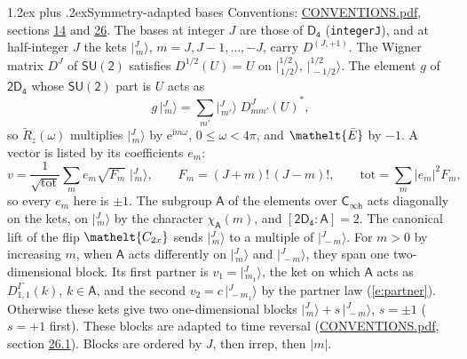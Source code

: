 \documentclass[10pt,a4paper]{article}
\makeatletter
\renewcommand\section{\@startsection{section}{1}{\z@}{-3ex plus -1ex minus -.2ex}%
  {1.2ex plus .2ex}{\normalfont\large\sffamily\bfseries\color{parttitle}}}
\numberwithin{equation}{section}
\newcommand{\eltfont}[1]{{\let\sigma\eltsigma\mathelt{#1}}}
\newcommand{\grp}[1]{\mathsf{#1}}
\newcommand{\elt}[1]{\eltfont{#1}}
\newcommand{\grpindex}[2]{[#1 : #2]}
\newcommand{\iunit}{\mathrm{i}}
\newcommand{\expe}{\mathrm{e}}
\newcommand{\irrJp}[2]{D^{(#1,#2)}}
\newcommand{\repD}[1]{D^{#1}}
\newcommand{\wignerD}[1]{D^{#1}}
\newcommand{\chiA}{\chi_{\grp{A}}}
\newcommand{\conj}[1]{{#1}^{*}}
\newcommand{\jm}[2]{\bigl\lvert{}^{#1}_{\,#2}\bigr\rangle}
\newcommand{\barred}[1]{\bar{#1}}
\newcommand{\lift}[1]{\tilde{#1}}
\makeatother
\begin{document}
\section{Symmetry-adapted bases}\label{s:bases}
Conventions: \href{../../CONVENTIONS.pdf}{CONVENTIONS.pdf}, sections \href{../../../rotation/CONVENTIONS.pdf\#conv.14}{14} and \href{../../CONVENTIONS.pdf\#conv.26}{26}.
\leavevmode\label{n:index.m}\label{n:vector.ket}The bases at integer $J$ are those of \href{../../../rotation/data/pdf/D4.pdf}{$\grp{D_{4}}$} (\texttt{integerJ}), and at half-integer $J$ the kets $\jm{J}{m}$, $m = J, J-1, \dots, -J$, carry $\irrJp{J}{+1}$. \label{n:matrix.wigner}The Wigner matrix $\wignerD{J}$ of $\grp{SU(2)}$ satisfies $\wignerD{1/2}(U) = U$ on $\jm{1/2}{1/2}$, $\jm{1/2}{-1/2}$. The element $g$ of $\grp{2D_{4}}$ whose $\grp{SU(2)}$ part is $U$ acts as
\begin{equation}\label{e:action}g\,\jm{J}{m} = \sum_{m'} \jm{J}{m'}\; \conj{\wignerD{J}_{m m'}(U)},\end{equation}
so $\lift{R}_{z}(\omega)$ multiplies $\jm{J}{m}$ by $\expe^{\iunit m\omega}$, $0 \le \omega < 4\pi$, and $\elt{\barred{E}}$ by $-1$. \label{n:index.ketcoefficient}\label{n:vector.basis.symmetry}\label{n:index.ketweight}\label{n:index.total}A vector is listed by its coefficients $e_m$:
\begin{equation}\label{e:ket}v = \frac{1}{\sqrt{\mathrm{tot}}}\sum_m e_m\sqrt{F_m}\;\jm{J}{m},\qquad F_m = (J+m)!\,(J-m)!,\qquad \mathrm{tot} = \sum_m |e_m|^2F_m,\end{equation}
so every $e_m$ here is $\pm 1$.
\leavevmode\label{n:group.A}\label{n:function.character.abelian}The subgroup $\grp{A}$ of the elements over $\grp{C_{\infty h}}$ acts diagonally on the kets, on $\jm{J}{m}$ by the character $\chiA(m)$, and $\grpindex{\grp{2D_{4}}}{\grp{A}} = 2$. The canonical lift of the flip $\elt{C_{2x}}$ sends $\jm{J}{m}$ to a multiple of $\jm{J}{-m}$. For $m > 0$ by increasing $m$, when $\grp{A}$ acts differently on $\jm{J}{m}$ and $\jm{J}{-m}$, they span one two-dimensional block. \label{n:index.partner.sign}Its first partner is $v_1 = \jm{J}{m_1}$, the ket on which $\grp{A}$ acts as $\repD{\Gamma}_{1,1}(k)$, $k \in \grp{A}$, and the second $v_2 = c\,\jm{J}{-m_1}$ by the partner law (\ref{e:partner}). \label{n:index.pair.sign}Otherwise these kets give two one-dimensional blocks $\jm{J}{m} + s\,\jm{J}{-m}$, $s = \pm 1$ ($s = +1$ first). These blocks are adapted to time reversal (\href{../../CONVENTIONS.pdf}{CONVENTIONS.pdf}, section \href{../../CONVENTIONS.pdf\#conv.26.1}{26.1}). Blocks are ordered by $J$, then irrep, then $|m|$.
\end{document}
